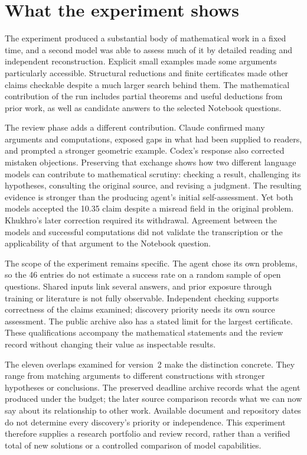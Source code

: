 \section{What the experiment shows}
\label{sec:discussion}

The experiment produced a substantial body of mathematical work in a
fixed time, and a second model was able to assess much of it by detailed
reading and independent reconstruction. Explicit small examples made
some arguments particularly accessible. Structural reductions and finite
certificates made other claims checkable despite a much larger search
behind them. The mathematical contribution of the run includes partial
theorems and useful deductions from prior work, as well as candidate
answers to the selected Notebook questions.

The review phase adds a different contribution. Claude confirmed many
arguments and computations, exposed gaps in what had been supplied to
readers, and prompted a stronger geometric example. Codex's response
also corrected mistaken objections. Preserving that exchange shows how
two different language models can contribute to mathematical scrutiny:
checking a result, challenging its hypotheses, consulting the original
source, and revising a judgment. The resulting evidence is stronger than
the producing agent's initial self-assessment. Yet both models accepted
the 10.35 claim despite a misread field in the original problem.
Khukhro's later correction required its withdrawal. Agreement between
the models and successful computations did not validate the transcription
or the applicability of that argument to the Notebook question.

The scope of the experiment remains specific. The agent chose its own
problems, so the 46 entries do not estimate a success rate on a random
sample of open questions. Shared inputs link several answers, and
prior exposure through training or literature is not fully observable.
Independent checking supports correctness of the claims examined;
discovery priority needs its own source assessment. The public archive
also has a stated limit for the largest certificate. These qualifications
accompany the mathematical statements and the review record without
changing their value as inspectable results.

The eleven overlaps examined for version~2 make the distinction concrete.
They range from matching arguments to different constructions with
stronger hypotheses or conclusions. The preserved deadline archive
records what the agent produced under the budget; the later source
comparison records what we can now say about its relationship to other
work. Available document and repository dates do not determine every
discovery's priority or independence. This experiment therefore supplies
a research portfolio and review record, rather than a verified total of
new solutions or a controlled comparison of model capabilities.

